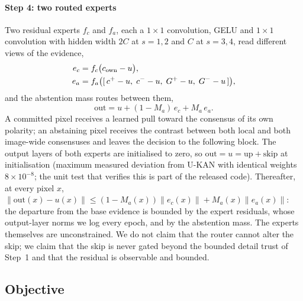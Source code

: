 \paragraph*{Step 4: two routed experts} Two residual experts $f_c$ and $f_a$, each a $1\times1$ convolution, GELU and $1\times1$ convolution with hidden width $2C$ at $s=1,2$ and $C$ at $s=3,4$, read different views of the evidence,
\begin{align}
e_c &= f_c\bigl(c_{\mathrm{own}}-u\bigr),\notag\\
e_a &= f_a\bigl([\,c^{+}-u,\;c^{-}-u,\;G^{+}-u,\;G^{-}-u\,]\bigr),
\label{eq:experts}
\end{align}
and the abstention mass routes between them,
\begin{equation}
\mathrm{out}=u+(1-M_a)\,e_c+M_a\,e_a .
\label{eq:route}
\end{equation}
A committed pixel receives a learned pull toward the consensus of its own polarity; an abstaining pixel receives the contrast between both local and both image-wide consensuses and leaves the decision to the following block. The output layers of both experts are initialised to zero, so $\mathrm{out}=u=\mathrm{up}+\mathrm{skip}$ at initialisation (maximum measured deviation from U-KAN with identical weights $8\times10^{-8}$; the unit test that verifies this is part of the released code). Thereafter, at every pixel $x$, $\lVert\mathrm{out}(x)-u(x)\rVert\le(1-M_a(x))\lVert e_c(x)\rVert+M_a(x)\lVert e_a(x)\rVert$: the departure from the base evidence is bounded by the expert residuals, whose output-layer norms we log every epoch, and by the abstention mass. The experts themselves are unconstrained. We do not claim that the router cannot alter the skip; we claim that the skip is never gated beyond the bounded detail trust of Step~1 and that the residual is observable and bounded.

\subsection{Objective}
\label{sec:objective}

